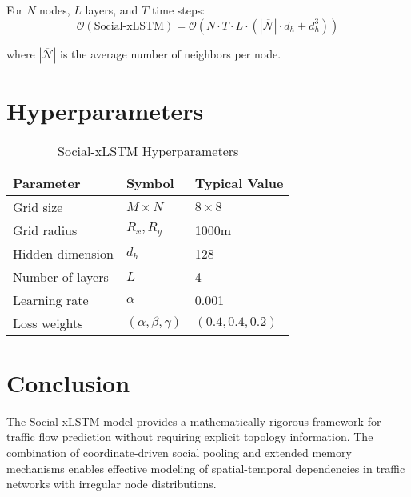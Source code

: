 \documentclass[11pt,a4paper]{article}
\begin{document}
For $N$ nodes, $L$ layers, and $T$ time steps:
\begin{equation}
\mathcal{O}(\text{Social-xLSTM}) = \mathcal{O}(N \cdot T \cdot L \cdot (|\overline{\mathcal{N}}| \cdot d_h + d_h^3))
\end{equation}

where $|\overline{\mathcal{N}}|$ is the average number of neighbors per node.

\section{Hyperparameters}

\begin{table}[h]
\centering
\begin{tabular}{|l|l|l|}
\hline
Parameter & Symbol & Typical Value \\
\hline
Grid size & $M \times N$ & $8 \times 8$ \\
Grid radius & $R_x, R_y$ & 1000m \\
Hidden dimension & $d_h$ & 128 \\
Number of layers & $L$ & 4 \\
Learning rate & $\alpha$ & 0.001 \\
Loss weights & $(\alpha, \beta, \gamma)$ & $(0.4, 0.4, 0.2)$ \\
\hline
\end{tabular}
\caption{Social-xLSTM Hyperparameters}
\end{table}

\section{Conclusion}

The Social-xLSTM model provides a mathematically rigorous framework for traffic flow prediction without requiring explicit topology information. The combination of coordinate-driven social pooling and extended memory mechanisms enables effective modeling of spatial-temporal dependencies in traffic networks with irregular node distributions.
\end{document}
